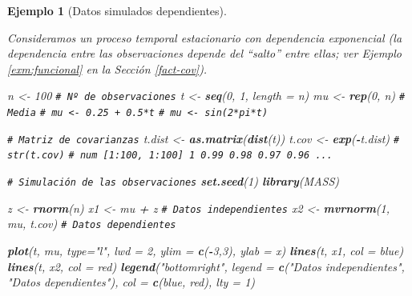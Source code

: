 \documentclass[
  spanish,
  10pt,
]{book}
\newenvironment{Shaded}{\begin{snugshade}}{\end{snugshade}}
\newcommand{\AttributeTok}[1]{\textcolor[rgb]{0.13,0.29,0.53}{#1}}
\newcommand{\CommentTok}[1]{\textcolor[rgb]{0.56,0.35,0.01}{\textit{#1}}}
\newcommand{\DecValTok}[1]{\textcolor[rgb]{0.00,0.00,0.81}{#1}}
\newcommand{\FunctionTok}[1]{\textcolor[rgb]{0.13,0.29,0.53}{\textbf{#1}}}
\newcommand{\NormalTok}[1]{#1}
\newcommand{\OtherTok}[1]{\textcolor[rgb]{0.56,0.35,0.01}{#1}}
\newcommand{\SpecialCharTok}[1]{\textcolor[rgb]{0.81,0.36,0.00}{\textbf{#1}}}
\newcommand{\StringTok}[1]{\textcolor[rgb]{0.31,0.60,0.02}{#1}}
\theoremstyle{break}
\newtheorem{example}{Ejemplo}[chapter]
\theoremstyle{nonumberplain}
\renewcommand{\CommentTok}[1]{\textcolor[rgb]{0.41,0.41,0.41}{\texttt{#1}}}
\begin{document}
\begin{example}[Datos simulados dependientes]
\protect\hypertarget{exm:sim-dep}{}\label{exm:sim-dep}

Consideramos un proceso temporal estacionario con dependencia exponencial
(la dependencia entre las observaciones depende del ``salto'' entre ellas;
ver Ejemplo \ref{exm:funcional} en la Sección \ref{fact-cov}).

\begin{Shaded}
\begin{Highlighting}[]
\NormalTok{n }\OtherTok{\textless{}{-}} \DecValTok{100}          \CommentTok{\# Nº de observaciones}
\NormalTok{t }\OtherTok{\textless{}{-}} \FunctionTok{seq}\NormalTok{(}\DecValTok{0}\NormalTok{, }\DecValTok{1}\NormalTok{, }\AttributeTok{length =}\NormalTok{ n)}
\NormalTok{mu }\OtherTok{\textless{}{-}} \FunctionTok{rep}\NormalTok{(}\DecValTok{0}\NormalTok{, n)   }\CommentTok{\# Media}
\CommentTok{\# mu \textless{}{-} 0.25 + 0.5*t}
\CommentTok{\# mu \textless{}{-} sin(2*pi*t)}

\CommentTok{\# Matriz de covarianzas}
\NormalTok{t.dist }\OtherTok{\textless{}{-}} \FunctionTok{as.matrix}\NormalTok{(}\FunctionTok{dist}\NormalTok{(t))}
\NormalTok{t.cov }\OtherTok{\textless{}{-}} \FunctionTok{exp}\NormalTok{(}\SpecialCharTok{{-}}\NormalTok{t.dist)}
\CommentTok{\# str(t.cov)}
\CommentTok{\# num [1:100, 1:100] 1 0.99 0.98 0.97 0.96 ...}

\CommentTok{\# Simulación de las observaciones}
\FunctionTok{set.seed}\NormalTok{(}\DecValTok{1}\NormalTok{)}
\FunctionTok{library}\NormalTok{(MASS)}

\NormalTok{z }\OtherTok{\textless{}{-}} \FunctionTok{rnorm}\NormalTok{(n)}
\NormalTok{x1 }\OtherTok{\textless{}{-}}\NormalTok{ mu }\SpecialCharTok{+}\NormalTok{ z }\CommentTok{\# Datos independientes}
\NormalTok{x2 }\OtherTok{\textless{}{-}} \FunctionTok{mvrnorm}\NormalTok{(}\DecValTok{1}\NormalTok{, mu, t.cov) }\CommentTok{\# Datos dependientes}

\FunctionTok{plot}\NormalTok{(t, mu, }\AttributeTok{type=}\StringTok{"l"}\NormalTok{, }\AttributeTok{lwd =} \DecValTok{2}\NormalTok{, }\AttributeTok{ylim =} \FunctionTok{c}\NormalTok{(}\SpecialCharTok{{-}}\DecValTok{3}\NormalTok{,}\DecValTok{3}\NormalTok{), }\AttributeTok{ylab =} \StringTok{\textquotesingle{}x\textquotesingle{}}\NormalTok{)}
\FunctionTok{lines}\NormalTok{(t, x1, }\AttributeTok{col =} \StringTok{\textquotesingle{}blue\textquotesingle{}}\NormalTok{)}
\FunctionTok{lines}\NormalTok{(t, x2, }\AttributeTok{col =} \StringTok{\textquotesingle{}red\textquotesingle{}}\NormalTok{)}
\FunctionTok{legend}\NormalTok{(}\StringTok{"bottomright"}\NormalTok{, }\AttributeTok{legend =} \FunctionTok{c}\NormalTok{(}\StringTok{"Datos independientes"}\NormalTok{, }\StringTok{"Datos dependientes"}\NormalTok{), }
       \AttributeTok{col =} \FunctionTok{c}\NormalTok{(}\StringTok{\textquotesingle{}blue\textquotesingle{}}\NormalTok{, }\StringTok{\textquotesingle{}red\textquotesingle{}}\NormalTok{), }\AttributeTok{lty =} \DecValTok{1}\NormalTok{)}
\end{Highlighting}
\end{Shaded}


\end{example}
\end{document}
